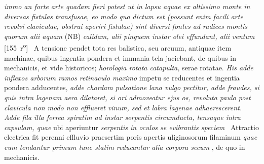 \textit{immo an forte arte quadam fieri potest ut in lapsu aquae ex altissimo monte in diversas fistulas transfusae, eo modo quo dictum est (possunt enim facili arte revolvi claviculae, obstrui aperiri fistulae) sint diversi fontes ad radices montis\protect{} quorum alii aquam }
(NB) \textit{calidam, alii pinguem instar olei effundant, alii ventum}  \textit{}
[155~r\textsuperscript{o}]
\pend%
\pstart%
%
%
%
% 
 \, A tensione pendet tota res balistica, seu arcuum, antiquae item machinae, quibus ingentia pondera et immania tela jaciebant, de quibus in mechanicis, et vide historicos;
\textit{horologia rotata\protect{} catapulta,} serae rotatae. \textit{His adde inflexos arborum ramos  retinaculo maximo} impetu se reducentes et ingentia pondera adducentes, \textit{adde chordam
 pulsatione lana vulgo pectitur, adde fraudes,  si quis intra lagenam aera dilataret, si ori admoveatur ejus os, revoluta paulo post clavicula non modo non efflueret vinum, sed et labra lagenae adhaerescerent. Adde fila illa ferrea spiratim ad instar serpentis circumducta, tensaque intra capsulam, quae} ubi aperiuntur \textit{serpentis in oculos se evibrantis speciem } 
\pend 
\pstart {} \, Attractio electrica fit perenni effluvio praesertim poris apertis uliginosorum filaminum\protect{} 
\textit{quae cum tendantur primum tunc statim reducantur alia corpora secum }, de quo in mechanicis.
